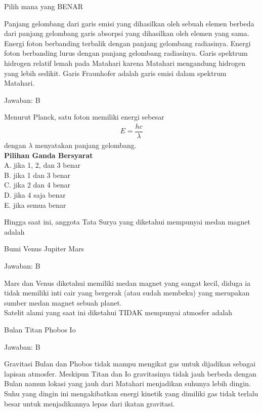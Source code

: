 \documentclass[11pt,fleqn]{exam}
\begin{document}
\begin{questions}
\question Pilih mana yang BENAR
\begin{choices}
\choice Panjang gelombang dari garis emisi yang dihasilkan oleh sebuah elemen berbeda dari panjang gelombang garis absorpsi yang dihasilkan oleh elemen yang sama.
\choice Energi foton berbanding terbalik dengan panjang gelombang radiasinya.
\choice Energi foton berbanding lurus dengan panjang gelombang radiasinya.
\choice Garis spektrum hidrogen relatif lemah pada Matahari karena Matahari mengandung hidrogen yang lebih sedikit.
\choice Garis Fraunhofer adalah garis emisi dalam spektrum Matahari.
\end{choices}

Jawaban: B

Menurut Planck, satu foton memiliki energi sebesar
\begin{eqnarray*}
E=\dfrac{hc}{\lambda}
\end{eqnarray*}
dengan $\lambda$ menyatakan panjang gelombang.\\


\textbf{Pilihan Ganda Bersyarat}\\
A. jika 1, 2, dan 3 benar\\
B. jika 1 dan 3 benar\\
C. jika 2 dan 4 benar\\
D. jika 4 saja benar\\
E. jika semua benar\\

{%
\renewcommand*\thechoice{\arabic{choice}} 
%
\question Hingga saat ini, anggota Tata Surya yang diketahui mempunyai medan magnet adalah
\begin{choices}
\choice Bumi
\choice Venus
\choice Jupiter
\choice Mars
\end{choices}

Jawaban: B

Mars dan Venus diketahui memiliki medan magnet yang sangat kecil, diduga ia tidak memiliki inti cair yang bergerak (atau sudah membeku) yang merupakan sumber medan magnet sebuah planet.\\


\question Satelit alami yang saat ini diketahui TIDAK mempunyai atmosfer adalah
\begin{choices}
\choice Bulan
\choice Titan
\choice Phobos
\choice Io
\end{choices}

Jawaban: B

Gravitasi Bulan dan Phobos tidak mampu mengikat gas untuk dijadikan sebagai lapisan atmosfer. Meskipun Titan dan Io gravitasinya tidak jauh berbeda dengan Bulan namun lokasi yang jauh dari Matahari menjadikan suhunya lebih dingin. Suhu yang dingin ini mengakibatkan energi kinetik yang dimiliki gas tidak terlalu besar untuk menjadikannya lepas dari ikatan gravitasi.\\


}
\end{questions}
\end{document}
